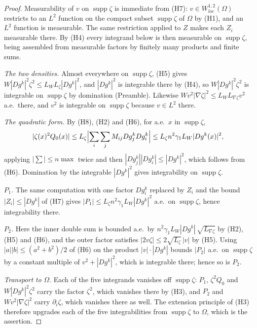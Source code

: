 \begin{proof}
Measurability of $v$ on $\operatorname{supp}\zeta$ is immediate from (H7):
$v\in W^{1,2}_{loc}(\Omega)$ restricts to an $L^2$ function on the compact
subset $\operatorname{supp}\zeta$ of $\Omega$ by (H1), and an $L^2$ function is
measurable.  The same restriction applied to $Z$ makes each $Z_i$ measurable
there.  By (H4) every integrand below is then measurable on
$\operatorname{supp}\zeta$, being assembled from measurable factors by finitely
many products and finite sums.

\emph{The two densities.}  Almost everywhere on $\operatorname{supp}\zeta$,
(H5) gives $W|Dg^k|^2\zeta^2\le L_WL_\zeta|Dg^k|^2$, and $|Dg^k|^2$ is
integrable there by (H4), so $W|Dg^k|^2\zeta^2$ is integrable on
$\operatorname{supp}\zeta$ by domination (Preamble).  Likewise
$Wv^2|\nabla\zeta|^2\le L_WL_{\nabla\zeta}v^2$ a.e.\ there, and $v^2$ is
integrable on $\operatorname{supp}\zeta$ because $v\in L^2$ there.

\emph{The quadratic form.}  By (H8), (H2) and (H6), for a.e.\ $x$ in
$\operatorname{supp}\zeta$,
\[
|\zeta(x)^2Q_0(x)|\le L_\zeta\Bigl|\sum_i\sum_jM_{ij}Dg^k_jDg^k_i\Bigr|
\le L_\zeta n^2\gamma_1L_W|Dg^k(x)|^2 ,
\]
applying $|\sum|\le n\max$ twice and then
$|Dg^k_j||Dg^k_i|\le|Dg^k|^2$, which follows from (H6).  Domination by the
integrable $|Dg^k|^2$ gives integrability on $\operatorname{supp}\zeta$.

\emph{$P_1$.}  The same computation with one factor $Dg^k_i$ replaced by $Z_i$
and the bound $|Z_i|\le|Dg^k|$ of (H7) gives
$|P_1|\le L_\zeta n^2\gamma_1L_W|Dg^k|^2$ a.e.\ on $\operatorname{supp}\zeta$,
hence integrability there.

\emph{$P_2$.}  Here the inner double sum is bounded a.e.\ by
$n^2\gamma_1L_W|Dg^k|\,\sqrt{L_{\nabla\zeta}}$ by (H2), (H5) and (H6), and the
outer factor satisfies $|2v\zeta|\le2\sqrt{L_\zeta}\,|v|$ by (H5).  Using
$|a||b|\le(a^2+b^2)/2$ of (H6) on the product $|v|\cdot|Dg^k|$ bounds $|P_2|$
a.e.\ on $\operatorname{supp}\zeta$ by a constant multiple of
$v^2+|Dg^k|^2$, which is integrable there; hence so is $P_2$.

\emph{Transport to $\Omega$.}  Each of the five integrands vanishes off
$\operatorname{supp}\zeta$: $P_1$, $\zeta^2Q_0$ and $W|Dg^k|^2\zeta^2$ carry
the factor $\zeta^2$, which vanishes there by (H3), and $P_2$ and
$Wv^2|\nabla\zeta|^2$ carry $\partial_i\zeta$, which vanishes there as well.
The extension principle of (H3) therefore upgrades each of the five
integrabilities from $\operatorname{supp}\zeta$ to $\Omega$, which is the
assertion.
\end{proof}
